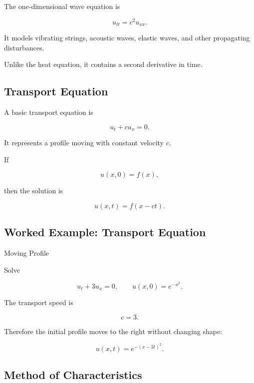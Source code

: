 The one-dimensional wave equation is

\[
\boxed{
u_{tt}
=
c^2u_{xx}.
}
\]

It models vibrating strings, acoustic waves, elastic waves, and other
propagating disturbances.

Unlike the heat equation, it contains a second derivative in time.

\subsection{Transport Equation}
\label{subsec:transport-equation}

A basic transport equation is

\[
\boxed{
u_t
+
c u_x
=
0.
}
\]

It represents a profile moving with constant velocity \(c\).

If

\[
u(x,0)
=
f(x),
\]

then the solution is

\[
\boxed{
u(x,t)
=
f(x-ct).
}
\]

\subsection{Worked Example: Transport Equation}
\label{subsec:worked-transport-equation}

\begin{workedexamplebox}{Moving Profile}

Solve

\[
u_t+3u_x=0,
\qquad
u(x,0)=e^{-x^2}.
\]

The transport speed is

\[
c=3.
\]

Therefore the initial profile moves to the right without changing shape:

\begin{answerbox}
\[
\boxed{
u(x,t)
=
e^{-(x-3t)^2}.
}
\]
\end{answerbox}

\end{workedexamplebox}

\subsection{Method of Characteristics}
\label{subsec:method-of-characteristics}

